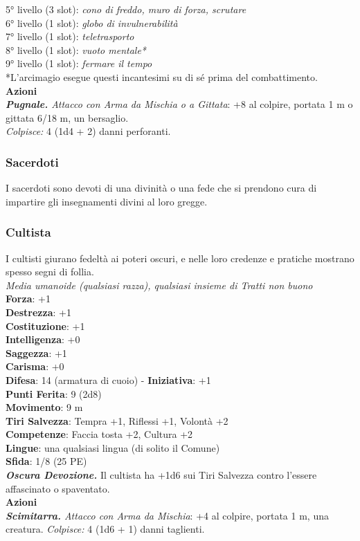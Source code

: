 \begin{multicols}{2}
5° livello (3 slot): \emph{cono di freddo, muro di forza, scrutare}\\
6° livello (1 slot): \emph{globo di invulnerabilità}\\
7° livello (1 slot): \emph{teletrasporto}\\
8° livello (1 slot): \emph{vuoto mentale*}\\
9° livello (1 slot): \emph{fermare il tempo}\\
*L'arcimagio esegue questi incantesimi su di sé prima del  combattimento.\\
\smallskip\textbf{Azioni}\\
\emph{\textbf{Pugnale.} Attacco con Arma da Mischia o a Gittata}: +8 al colpire, portata 1 m o gittata 6/18 m, un bersaglio.\\
\emph{Colpisce:} 4 (1d4 + 2) danni perforanti.\\

\subsubsection{Sacerdoti}
I sacerdoti sono devoti di una divinità o una fede che si prendono cura di impartire gli insegnamenti divini al loro gregge.\\

\subsubsection{Cultista}
I cultisti giurano fedeltà ai poteri oscuri, e nelle loro credenze e pratiche mostrano spesso segni di follia.\\
\emph{Media umanoide (qualsiasi razza), qualsiasi insieme di Tratti non buono}\\
\textbf{Forza}: +1\\
\textbf{Destrezza}: +1\\
\textbf{Costituzione}: +1\\
\textbf{Intelligenza}: +0\\
\textbf{Saggezza}: +1\\
\textbf{Carisma}: +0\\
\textbf{Difesa}: 14 (armatura di cuoio) - \textbf{Iniziativa}: +1\\
\textbf{Punti Ferita}: 9 (2d8)\\
\textbf{Movimento}: 9 m\\
\textbf{Tiri Salvezza}: Tempra +1, Riflessi +1, Volontà +2 \\
\textbf{Competenze}: Faccia tosta +2, Cultura +2\\
\textbf{Lingue}: una qualsiasi lingua (di solito il Comune)\\
\textbf{Sfida}: 1/8 (25 PE)\smallskip\\
\emph{\textbf{Oscura Devozione.}} Il cultista ha +1d6 sui Tiri Salvezza contro l'essere affascinato o spaventato.\\
\smallskip\textbf{Azioni}\\
\emph{\textbf{Scimitarra.} Attacco con Arma da Mischia}: +4 al colpire, portata 1 m, una creatura.
\emph{Colpisce:} 4 (1d6 + 1) danni taglienti.\\


\end{multicols}
